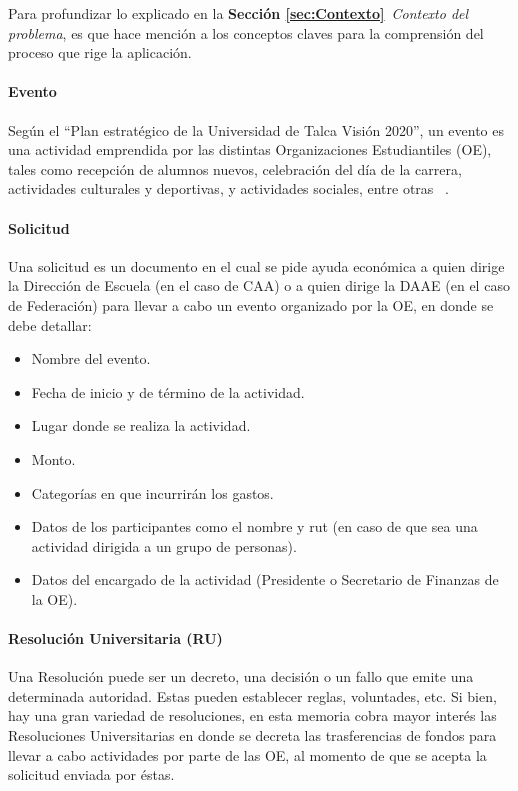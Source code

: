 Para profundizar lo explicado en la \textbf{Sección \ref{sec:Contexto}}~\emph{Contexto del problema}, es que hace mención a los conceptos claves para la comprensión del proceso que rige la aplicación.

\paragraph{Evento}

  Según el ``Plan estratégico de la Universidad de Talca Visión 2020'', un evento es una actividad emprendida por las distintas Organizaciones Estudiantiles (OE), tales como recepción de alumnos nuevos, celebración del día de la carrera, actividades culturales y deportivas, y actividades sociales, entre otras ~\cite{5}. 

\paragraph{Solicitud}

  Una solicitud es un documento en el cual se pide ayuda económica a quien dirige la Dirección de Escuela (en el caso de CAA) o a quien dirige la DAAE (en el caso de Federación) para llevar a cabo un evento organizado por la OE, en donde se debe detallar:

  \begin{itemize}
      \item Nombre del evento.
      \item Fecha de inicio y de término de la actividad.
      \item Lugar donde se realiza la actividad. 
      \item Monto. 
      \item Categorías en que incurrirán los gastos.
      \item Datos de los participantes como el nombre y rut (en caso de que sea una actividad dirigida a un grupo de personas). 
      \item Datos del encargado de la actividad (Presidente o Secretario de Finanzas de la OE).
  \end{itemize}

\paragraph{Resolución Universitaria (RU)}

  Una Resolución puede ser un decreto, una decisión o un fallo que emite una determinada autoridad. Estas pueden establecer reglas, voluntades, etc. Si bien, hay una gran variedad de resoluciones, en esta memoria cobra mayor interés las Resoluciones Universitarias en donde se decreta las trasferencias de fondos para llevar a cabo actividades por parte de las OE, al momento de que se acepta la solicitud enviada por éstas.

